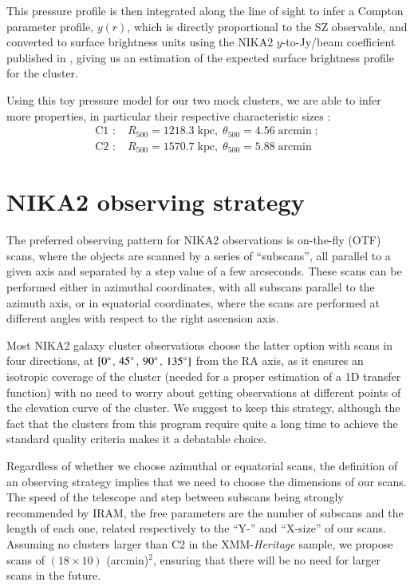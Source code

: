 \documentclass[11pt]{article}
\newcommand{\fh}{_{500}}
\begin{document}
This pressure profile is then integrated along the line of sight to infer a Compton parameter profile, $y(r)$, which is directly proportional to the SZ observable, and converted to surface brightness units using the NIKA2 $y$-to-Jy/beam coefficient published in \cite{Ruppin2018}, giving us an estimation of the expected surface brightness profile for the cluster.

Using this toy pressure model for our two mock clusters, we are able to infer more properties, in particular their respective characteristic sizes :
    \begin{align*}
        \text{C1 :}\;& R\fh = 1218.3 \;\mathrm{kpc},\; \theta\fh = 4.56 \;\mathrm{arcmin}\; ; \\
        \text{C2 :}\;& R\fh = 1570.7 \;\mathrm{kpc},\; \theta\fh = 5.88 \;\mathrm{arcmin}
    \end{align*}

\section{NIKA2 observing strategy} \label{strategy}

The preferred observing pattern for NIKA2 observations is on-the-fly (OTF) scans, where the objects are scanned by a series of ``subscans'', all parallel to a given axis and separated by a step value of a few arcseconds.
These scans can be performed either in azimuthal coordinates, with all subscans parallel to the azimuth axis, or in equatorial coordinates, where the scans are performed at different angles with respect to the right ascension axis.

Most NIKA2 galaxy cluster observations choose the latter option with scans in four directions, at $[0\degree$, $45\degree$, $90\degree$, $135\degree]$ from the RA axis, as it ensures an isotropic coverage of the cluster (needed for a proper estimation of a 1D transfer function) with no need to worry about getting observations at different points of the elevation curve of the cluster.
We suggest to keep this strategy, although the fact that the clusters from this program require quite a long time to achieve the standard quality criteria makes it a debatable choice.

\vspace{11pt}
Regardless of whether we choose azimuthal or equatorial scans, the definition of an observing strategy implies that we need to choose the dimensions of our scans.
The speed of the telescope and step between subscans being strongly recommended by IRAM, the free parameters are the number of subscans and the length of each one, related respectively to the ``Y-'' and ``X-size'' of our scans. 
Assuming no clusters larger than C2 in the XMM-\textit{Heritage} sample, we propose scans of $(18 \times 10)$ (arcmin)$^2$, ensuring that there will be no need for larger scans in the future.
\end{document}
